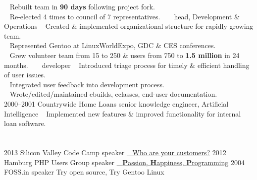 \documentclass[]{friggeri-cv} %
\begin{document}
\begin{entrylist}
{{\tiny {}} ~ Rebuilt team in \textbf{90 days} following project fork.\\
{\tiny {}} ~ Re-elected 4 times to council of 7 representatives.}
\entry
{~}
{~}
{head, Development \& Operations}
{{\tiny {}} ~  Created \& implemented organizational structure for rapidly growing team.\\
{\tiny {}} ~ Represented Gentoo at LinuxWorldExpo, GDC \& CES conferences.\\
{\tiny {}} ~ Grew volunteer team from 15 to 250 \& users from 750 to \textbf{1.5 million} in 24 months.}
\entry
{~}
{~}
{developer}
{{\tiny {}} ~ Introduced triage process for timely \& efficient handling of user issues.\\
{\tiny {}} ~ Integrated user feedback into development process.\\
{\tiny {}} ~ Wrote/edited/maintained ebuilds, eclasses, end-user documentation.\\
}
\entry
{2000--2001}
{Countrywide Home Loans}
{senior knowledge engineer, Artificial Intelligence}
{{\tiny {}} ~ Implemented new features \& improved functionality for internal loan software.}
\end{entrylist}


\section{{} {} {\normalsize {}}}

\begin{entrylist}
\entry
{2013}
{Silicon Valley Code Camp}
{speaker}
{\href{http://www.siliconvalley-codecamp.com/Session/2013/who-are-your-customers}{{\tiny \color{LightGray}} ~ Who are your customers?}}
\entry
{2012}
{Hamburg PHP Users Group}
{speaker}
{\href{https://speakerdeck.com/seemantk/developing-with-passion}{{\tiny \color{LightGray}} ~  \textbf{P}assion, \textbf{H}appiness, \textbf{P}rogramming}}
\entry
{2004}
{FOSS.in}
{speaker}
{Try open source, Try Gentoo Linux}
\end{entrylist}
\end{document}
